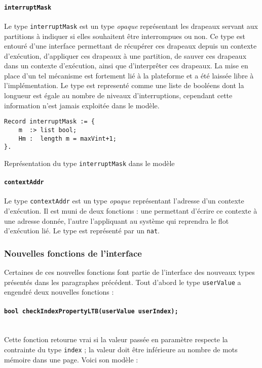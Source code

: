 		\paragraph{\texttt{interruptMask}} Le type \texttt{interruptMask} est un type \emph{opaque} représentant les drapeaux servant aux partitions à indiquer si elles souhaitent être interrompues ou non. Ce type est entouré d'une interface permettant de récupérer ces drapeaux depuis un contexte d'exécution, d'appliquer ces drapeaux à une partition, de sauver ces drapeaux dans un contexte d'exécution, ainsi que d'interprêter ces drapeaux. La mise en place d'un tel mécanisme est fortement lié à la plateforme et a été laissée libre à l'implémentation. Le type est representé comme une liste de booléens dont la longueur est égale au nombre de niveaux d'interruptions, cependant cette information n'est jamais exploitée dans le modèle.
		\begin{listing}[!ht]
			\begin{verbatim}
Record interruptMask := {
    m  :> list bool;
    Hm :  length m = maxVint+1;
}.
			\end{verbatim}
			\caption{Représentation du type \texttt{interruptMask} dans le modèle}
		\end{listing}

		\paragraph{\texttt{contextAddr}} Le type \texttt{contextAddr} est un type \emph{opaque} représentant l'adresse d'un contexte d'exécution. Il est muni de deux fonctions : une permettant d'écrire ce contexte à une adresse donnée, l'autre l'appliquant au système qui reprendra le flot d'exécution lié. Le type est représenté par un \texttt{nat}.


		\subsubsection{Nouvelles fonctions de l'interface}

		Certaines de ces nouvelles fonctions font partie de l'interface des nouveaux types présentés dans les paragraphes précédent. Tout d'abord le type \texttt{userValue} a engendré deux nouvelles fonctions :
		\paragraph{\texttt{bool checkIndexPropertyLTB(userValue userIndex);}}~\\
		Cette fonction retourne vrai si la valeur passée en paramètre respecte la contrainte du type \texttt{index} ; la valeur doit être inférieure au nombre de mots mémoire dans une page. Voici son modèle :

